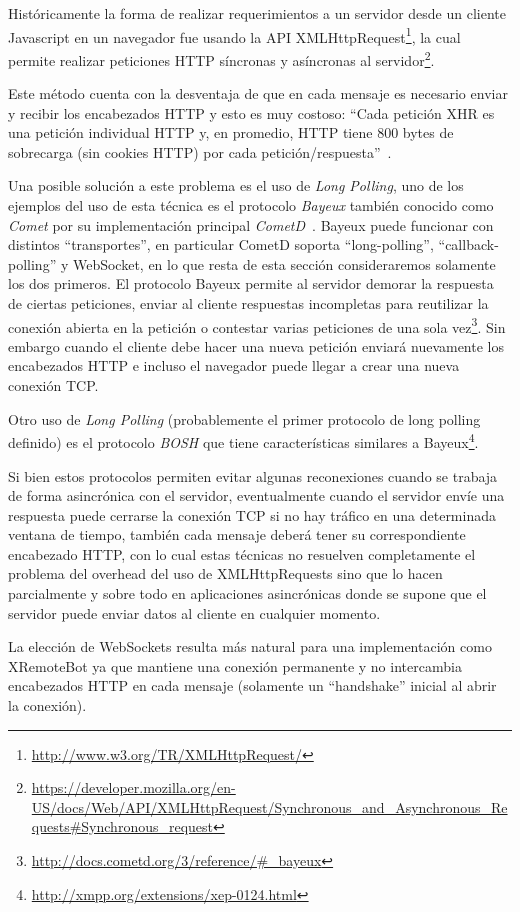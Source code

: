Históricamente la forma de realizar requerimientos a un servidor desde un
cliente Javascript en un navegador fue usando la API
XMLHttpRequest\footnote{\url{http://www.w3.org/TR/XMLHttpRequest/}}, la
cual permite realizar peticiones HTTP síncronas y asíncronas al
servidor\footnote{\url{https://developer.mozilla.org/en-US/docs/Web/API/XMLHttpRequest/Synchronous_and_Asynchronous_Requests\#Synchronous_request}}.

Este método cuenta con la desventaja de que en cada mensaje es necesario
enviar y recibir los encabezados HTTP y esto es muy costoso:
``Cada petición XHR es una petición individual HTTP y, en promedio, HTTP
tiene 800 bytes de sobrecarga (sin cookies HTTP) por cada
petición/respuesta''~\citep{grigorik_2013}.

Una posible solución a este problema es el uso de \textit{Long Polling},
uno de los ejemplos del uso de esta técnica es el protocolo \textit{Bayeux}
también conocido como \textit{Comet} por
su implementación principal
\textit{CometD}~\citep{roden_2010}. Bayeux puede funcionar con distintos
``transportes'', en particular CometD soporta ``long-polling'',
``callback-polling'' y WebSocket, en lo que resta de esta sección
consideraremos solamente los dos primeros.
El protocolo Bayeux permite al servidor demorar la respuesta
de ciertas peticiones, enviar al cliente respuestas incompletas para reutilizar
la conexión abierta en la petición o contestar varias peticiones de
una sola vez\footnote{\url{http://docs.cometd.org/3/reference/\#_bayeux}}.
Sin embargo cuando el cliente debe hacer una nueva petición enviará
nuevamente los encabezados HTTP e incluso el navegador puede llegar a
crear una nueva conexión TCP.

Otro uso de \textit{Long Polling} (probablemente el primer protocolo
de long polling definido) es el protocolo \textit{BOSH} que tiene
características similares a
Bayeux\footnote{\url{http://xmpp.org/extensions/xep-0124.html}}.

Si bien estos protocolos permiten evitar algunas reconexiones cuando
se trabaja de forma asincrónica con el servidor, eventualmente cuando el
servidor envíe una respuesta puede cerrarse la conexión TCP
si no hay tráfico en una determinada ventana de tiempo,
también cada mensaje
deberá tener su correspondiente encabezado HTTP, con lo cual
estas técnicas no resuelven completamente el problema del overhead del
uso de XMLHttpRequests sino que lo hacen parcialmente y sobre todo
en aplicaciones asincrónicas donde se supone que el servidor puede enviar
datos al cliente en cualquier momento.

La elección de WebSockets resulta más natural para una implementación
como XRemoteBot ya que mantiene una conexión permanente y no intercambia
encabezados HTTP en cada mensaje (solamente un ``handshake'' inicial
al abrir la conexión).

